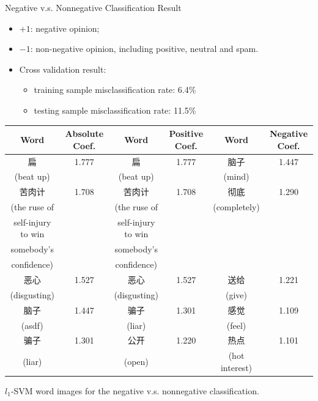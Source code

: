 \documentclass[12pt]{beamer}
\newcommand{\1}[1]{{\mathbf 1}\left\{#1\right\}}        %
\begin{document}
\begin{frame}{Negative v.s. Nonnegative Classification Result}
\begin{itemize}[<+->]
\item $+1$: negative opinion;
\item $-1$: non-negative opinion, including positive, neutral and spam.
\item Cross validation result: 
  \begin{itemize}[<+->]
  \item training sample misclassification rate: 6.4\%
  \item testing sample misclassification rate: 11.5\%
  \end{itemize}

\end{itemize}

\tiny
\begin{tabular}{|c|c||c|c||c|c|}
\hline
Word & Absolute Coef. & Word & Positive Coef. & Word & Negative Coef.\\ \hline  \hline
扁 & 1.777 & 扁 & 1.777 & 脑子 & 1.447\\
(beat up) & & (beat up) & & (mind) & \\\hline
苦肉计 & 1.708 & 苦肉计 & 1.708 & 彻底 & 1.290\\
(the ruse of  & & (the ruse of  &  &  (completely) &  \\
self-injury to win & &  self-injury to win &  & &  \\
somebody's & & somebody's  &  & &  \\
 confidence) & &  confidence)  &  & &  \\\hline
恶心 & 1.527 & 恶心 & 1.527 & 送给 & 1.221\\
(disgusting) & & (disgusting) & & (give) & \\\hline
脑子 & 1.447 & 骗子 & 1.301 & 感觉 & 1.109\\
(asdf) & & (liar) & & (feel) & \\\hline
骗子 & 1.301 & 公开 & 1.220 & 热点 & 1.101\\
(liar) & & (open) & & (hot interest) & \\\hline
\end{tabular}
$l_1$-SVM word images for the negative v.s. nonnegative classification.

\end{frame}
\end{document}
